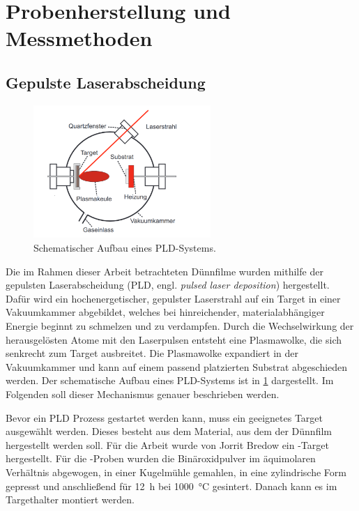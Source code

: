 \section{Probenherstellung und Messmethoden}\label{sec:messmethoden}

\subsection{Gepulste Laserabscheidung}\label{subsec:pld}
\begin{figure}
    \centering
    \includegraphics[width=0.6\textwidth]{../assets/messmethoden/pld/aufbau}
    \caption{Schematischer Aufbau eines PLD-Systems.}
    \label{fig:pld}
\end{figure}
Die im Rahmen dieser Arbeit betrachteten Dünnfilme wurden mithilfe der gepulsten Laserabscheidung
(PLD, engl. \textit{pulsed laser deposition}) hergestellt.
Dafür wird ein hochenergetischer, gepulster Laserstrahl auf ein Target in einer Vakuumkammer abgebildet, welches bei
hinreichender, materialabhängiger Energie beginnt zu schmelzen und zu verdampfen.
Durch die Wechselwirkung der herausgelösten Atome mit den Laserpulsen entsteht eine Plasmawolke, die sich senkrecht
zum Target ausbreitet.
Die Plasmawolke expandiert in der Vakuumkammer und kann auf einem passend platzierten Substrat abgeschieden werden.
Der schematische Aufbau eines PLD-Systems ist in \cref{fig:pld} dargestellt.
Im Folgenden soll dieser Mechanismus genauer beschrieben werden.

Bevor ein PLD Prozess gestartet werden kann, muss ein geeignetes Target ausgewählt werden.
Dieses besteht aus dem Material, aus dem der Dünnfilm hergestellt werden soll.
Für die Arbeit wurde von Jorrit Bredow ein \heo-Target hergestellt.
Für die \heo-Proben wurden die Binäroxidpulver im äquimolaren Verhältnis abgewogen, in einer Kugelmühle gemahlen,
in eine zylindrische Form gepresst und anschließend für \qty{12}{\hour} bei \qty{1000}{\celsius} gesintert.
Danach kann es im Targethalter montiert werden.

